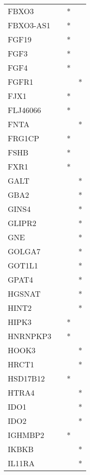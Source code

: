 \begin{longtable}{lccc}
FBXO3         &       &  * &         \\
FBXO3-AS1     &       &  * &         \\
FGF19         &       &  * &         \\
FGF3          &       &  * &         \\
FGF4          &       &  * &         \\
FGFR1         &       &    &       * \\
FJX1          &       &  * &         \\
FLJ46066      &       &  * &         \\
FNTA          &       &    &       * \\
FRG1CP        &       &  * &         \\
FSHB          &       &  * &         \\
FXR1          &       &  * &         \\
GALT          &       &    &       * \\
GBA2          &       &    &       * \\
GINS4         &       &    &       * \\
GLIPR2        &       &    &       * \\
GNE           &       &    &       * \\
GOLGA7        &       &    &       * \\
GOT1L1        &       &    &       * \\
GPAT4         &       &    &       * \\
HGSNAT        &       &    &       * \\
HINT2         &       &    &       * \\
HIPK3         &       &  * &         \\
HNRNPKP3      &       &  * &         \\
HOOK3         &       &    &       * \\
HRCT1         &       &    &       * \\
HSD17B12      &       &  * &         \\
HTRA4         &       &    &       * \\
IDO1          &       &    &       * \\
IDO2          &       &    &       * \\
IGHMBP2       &       &  * &         \\
IKBKB         &       &    &       * \\
IL11RA        &       &    &       * \\

\end{longtable}
